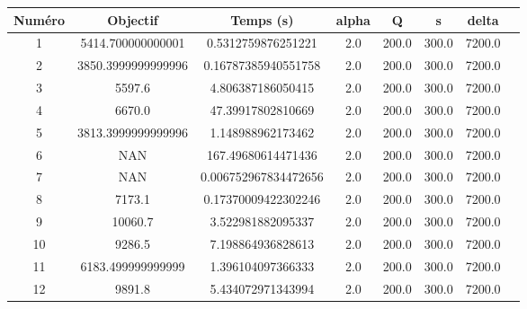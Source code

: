 \begin{tabular}{|c|c|c|c|c|c|c|c|}
\hline
 Numéro & Objectif & Temps (s) & alpha & Q & s & delta \\
\hline
1 & 5414.700000000001 & 0.5312759876251221 & 2.0 & 200.0 & 300.0 & 7200.0 \\ 
 \hline
2 & 3850.3999999999996 & 0.16787385940551758 & 2.0 & 200.0 & 300.0 & 7200.0 \\ 
 \hline
3 & 5597.6 & 4.806387186050415 & 2.0 & 200.0 & 300.0 & 7200.0 \\ 
 \hline
4 & 6670.0 & 47.39917802810669 & 2.0 & 200.0 & 300.0 & 7200.0 \\ 
 \hline
5 & 3813.3999999999996 & 1.148988962173462 & 2.0 & 200.0 & 300.0 & 7200.0 \\ 
 \hline
6 & NAN & 167.49680614471436 & 2.0 & 200.0 & 300.0 & 7200.0 \\ 
 \hline
7 & NAN & 0.006752967834472656 & 2.0 & 200.0 & 300.0 & 7200.0 \\ 
 \hline
8 & 7173.1 & 0.17370009422302246 & 2.0 & 200.0 & 300.0 & 7200.0 \\ 
 \hline
9 & 10060.7 & 3.522981882095337 & 2.0 & 200.0 & 300.0 & 7200.0 \\ 
 \hline
10 & 9286.5 & 7.198864936828613 & 2.0 & 200.0 & 300.0 & 7200.0 \\ 
 \hline
11 & 6183.499999999999 & 1.396104097366333 & 2.0 & 200.0 & 300.0 & 7200.0 \\ 
 \hline
12 & 9891.8 & 5.434072971343994 & 2.0 & 200.0 & 300.0 & 7200.0 \\ 
 \hline
\end{tabular}
